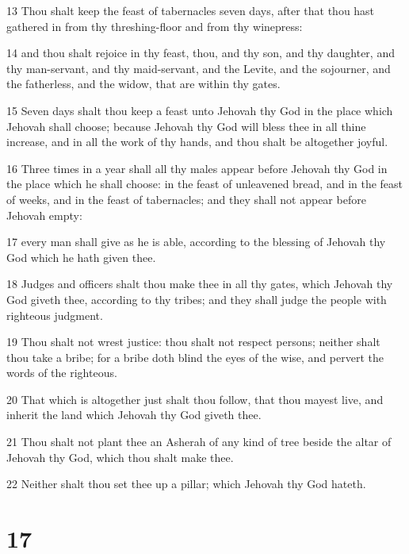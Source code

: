 \par 13 Thou shalt keep the feast of tabernacles seven days, after that thou hast gathered in from thy threshing-floor and from thy winepress:
\par 14 and thou shalt rejoice in thy feast, thou, and thy son, and thy daughter, and thy man-servant, and thy maid-servant, and the Levite, and the sojourner, and the fatherless, and the widow, that are within thy gates.
\par 15 Seven days shalt thou keep a feast unto Jehovah thy God in the place which Jehovah shall choose; because Jehovah thy God will bless thee in all thine increase, and in all the work of thy hands, and thou shalt be altogether joyful.
\par 16 Three times in a year shall all thy males appear before Jehovah thy God in the place which he shall choose: in the feast of unleavened bread, and in the feast of weeks, and in the feast of tabernacles; and they shall not appear before Jehovah empty:
\par 17 every man shall give as he is able, according to the blessing of Jehovah thy God which he hath given thee.
\par 18 Judges and officers shalt thou make thee in all thy gates, which Jehovah thy God giveth thee, according to thy tribes; and they shall judge the people with righteous judgment.
\par 19 Thou shalt not wrest justice: thou shalt not respect persons; neither shalt thou take a bribe; for a bribe doth blind the eyes of the wise, and pervert the words of the righteous.
\par 20 That which is altogether just shalt thou follow, that thou mayest live, and inherit the land which Jehovah thy God giveth thee.
\par 21 Thou shalt not plant thee an Asherah of any kind of tree beside the altar of Jehovah thy God, which thou shalt make thee.
\par 22 Neither shalt thou set thee up a pillar; which Jehovah thy God hateth.

\chapter{17}

